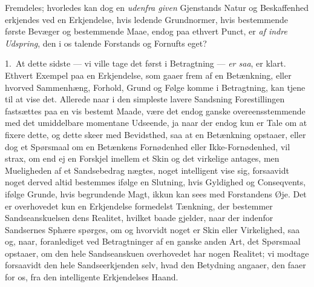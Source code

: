 \documentclass[12pt,a4paper]{book}
\newcommand{\apage}[1]{\marginnote{\footnotesize\textit{[#1]}}}
\begin{document}
Fremdeles; hvorledes kan dog en \emph{udenfra given} Gjenstands Natur og
Beskaffenhed erkjendes ved en Erkjendelse, hvis ledende Grundnormer, hvis
bestemmende første Bevæger og bestemmende Maae, endog paa ethvert Punct, er \emph{af
indre Udspring},%
 den i os talende Forstands og Fornufts eget?

1.~At dette sidste --- vi ville tage det først i Betragtning --- \emph{er saa}, er
klart. Ethvert Exempel paa en Erkjendelse, som gaaer frem af en Betænkning, eller
hvorved Sammenhæng, Forhold, \apage{60}  Grund og Følge komme i Betragtning, kan tjene til at
vise det. Allerede naar i den simpleste lavere Sandsning Forestillingen fastsættes
paa en vis bestemt Maade, være det endog ganske overeensstemmende med det
umiddelbare momentane Udseende, ja naar der endog kun er Tale om at fixere dette,
og dette skeer med Bevidsthed, saa at en Betænkning opstaaer, eller dog et
Spørsmaal om en Betænkens Fornødenhed eller Ikke-Fornødenhed, vil strax, om end ej
en Forskjel imellem et Skin og det virkelige antages, men Mueligheden af et
Sandsebedrag nægtes, noget intelligent vise sig, forsaavidt noget derved altid
bestemmes ifølge en Slutning, hvis Gyldighed og Conseqvents, ifølge Grunde, hvis
begrundende Magt, ikkun kan sees med Forstandens Øje. Det er overhovedet kun en
Erkjendelse formedelst Tænkning, der bestemmer Sandseanskuelsen dens Realitet,
hvilket baade gjelder, naar der indenfor Sandsernes Sphære spørges, om og hvorvidt
noget er Skin eller Virkelighed, saa og, naar, foranlediget ved Betragtninger af
en ganske anden Art, det Spørsmaal opstaaer, om den hele Sandseanskuen overhovedet
har nogen Realitet; vi modtage forsaavidt den hele Sandseerkjenden selv, hvad den
Betydning angaaer, den faaer for os, fra den intelligente Erkjendelses Haand.
\end{document}
